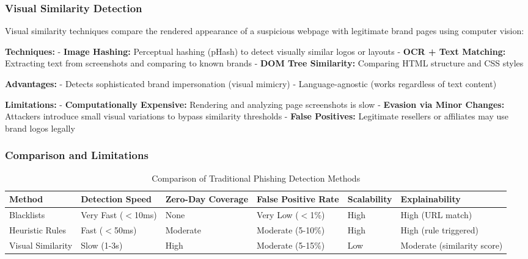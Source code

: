 \subsubsection{Visual Similarity
Detection}\label{visual-similarity-detection}

Visual similarity techniques compare the rendered appearance of a
suspicious webpage with legitimate brand pages using computer vision:

\textbf{Techniques:} - \textbf{Image Hashing:} Perceptual hashing
(pHash) to detect visually similar logos or layouts - \textbf{OCR + Text
Matching:} Extracting text from screenshots and comparing to known
brands - \textbf{DOM Tree Similarity:} Comparing HTML structure and CSS
styles

\textbf{Advantages:} - Detects sophisticated brand impersonation (visual
mimicry) - Language-agnostic (works regardless of text content)

\textbf{Limitations:} - \textbf{Computationally Expensive:} Rendering
and analyzing page screenshots is slow - \textbf{Evasion via Minor
Changes:} Attackers introduce small visual variations to bypass
similarity thresholds - \textbf{False Positives:} Legitimate resellers
or affiliates may use brand logos legally

\subsubsection{Comparison and
Limitations}\label{comparison-and-limitations}

\setlength{\tabcolsep}{4pt}
\begin{longtable}{
>{\raggedright\arraybackslash}p{}
>{\raggedright\arraybackslash}p{}
>{\raggedright\arraybackslash}p{}
>{\raggedright\arraybackslash}p{}
>{\raggedright\arraybackslash}p{}
>{\raggedright\arraybackslash}p{}}
\caption{Comparison of Traditional Phishing Detection
Methods} \\
\toprule
Method & Detection Speed & Zero-Day Coverage & False Positive Rate & Scalability & Explainability \\
\midrule

Blacklists & Very Fast ($<$10ms) & None & Very Low ($<$1\%)
& High & High (URL match) \\
Heuristic Rules & Fast ($<$50ms) & Moderate & Moderate (5-10\%) &
High & High (rule triggered) \\
Visual Similarity & Slow (1-3s) & High & Moderate (5-15\%) & Low &
Moderate (similarity score) \\

\bottomrule
\end{longtable}
\setlength{\tabcolsep}{6pt}

